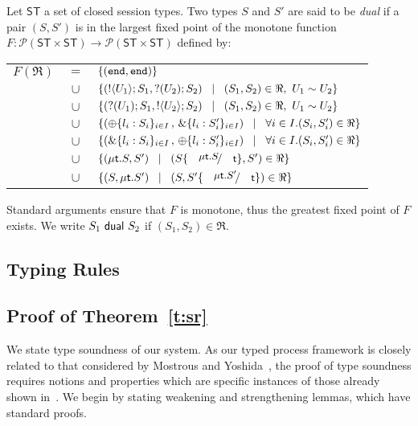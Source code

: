 \begin{definition}[Duality]
\label{def:dual}
Let $\mathsf{ST}$ a set of closed session types. 
Two types $S$ and $S'$ are said to be {\em dual} if a pair $(S,S')$ is 
in the largest fixed point of the monotone function
$F:\mathcal{P}(\mathsf{ST}\times \mathsf{ST}) \to 
\mathcal{P}(\mathsf{ST}\times \mathsf{ST})$ defined by:\\ %
\begin{tabular}{rcl}
$F(\Re)$ &$\!\!=\!\!$&	$\{(\mathtt{end}, \mathtt{end})\}$\\
         &$\!\!\cup\!\!$&	$\{(! \langle U_1 \rangle ; S_1, ? (U_2) ; S_2)
\;\;\;|\;\;\;(S_1, S_2)\in \Re, \  U_1 \sim U_2 \}$\\ 
       &$\!\!\cup\!\!$&	$\{(? (U_1) ; S_1, ! \langle U_2 \rangle ; S_2)
\;\;\;|\;\;\;(S_1, S_2)\in \Re, \ U_1 \sim U_2\}$\\ 
	&$\!\!\cup\!\!$&	$\{(\oplus \{l_i: S_i\}_{i \in I} \,,\, \& \{l_i: S_i'\}_{i \in I}) \;\;\;|\;\;\; \forall i\in I. (S_i, S_i')\in \Re\}$\\
	&$\!\!\cup\!\!$&	$\{(\& \{l_i: S_i\}_{i \in I}\,,\, \oplus \{l_i: S_i'\}_{i \in I}) \;\;\;|\;\;\; \forall i\in I. (S_i, S_i')\in \Re\}$\\
	&$\!\!\cup\!\!$&	$\set{(\trec{t}{S}, S')
\bnfbar (S\subst{\trec{t}{S}}{\vart{t}},S')\in \Re}$\\
	&$\!\!\cup\!\!$&	$\set{(S,\trec{t}{S'})
\bnfbar (S,S'\subst{\trec{t}{S'}}{\vart{t}})\in \Re}$\\[1mm]
\end{tabular}

\noindent
Standard arguments ensure that $F$ is monotone, thus the greatest fixed point
of $F$ exists. We write $S_1 \ \mathsf{dual}\  S_2$ if  $(S_1,S_2)\in \Re$. 
\end{definition}

\smallskip 

\subsection{Typing Rules}




\subsection{Proof of Theorem~\ref{t:sr}}
We state type soundness of our system.
As our typed process framework is closely related to that considered
by Mostrous and Yoshida~\cite{MostrousY15}, the proof of type soundness requires notions
and properties which are specific instances of those already shown in~\cite{MostrousY15}.
We begin by stating weakening and strengthening lemmas,
which have standard proofs.

